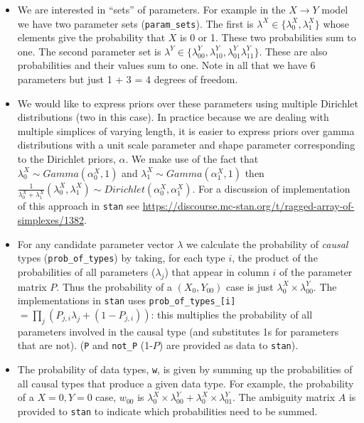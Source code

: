 \documentclass[
  12pt,
]{book}
\begin{document}
\begin{itemize}
\item
  We are interested in ``sets'' of parameters. For example in the \(X \rightarrow Y\) model we have two parameter sets (\texttt{param\_sets}). The first is \(\lambda^X \in \{\lambda^X_0, \lambda^X_1\}\) whose elements give the probability that \(X\) is 0 or 1. These two probabilities sum to one. The second parameter set is \(\lambda^Y \in \{\lambda^Y_{00}, \lambda^Y_{10}, \lambda^Y_{01} \lambda^Y_{11}\}\). These are also probabilities and their values sum to one. Note in all that we have 6 parameters but just 1 + 3 = 4 degrees of freedom.
\item
  We would like to express priors over these parameters using multiple Dirichlet distributions (two in this case). In practice because we are dealing with multiple simplices of varying length, it is easier to express priors over gamma distributions with a unit scale parameter and shape parameter corresponding to the Dirichlet priors, \(\alpha\). We make use of the fact that \(\lambda^X_0 \sim Gamma(\alpha^X_0,1)\) and \(\lambda^X_1 \sim Gamma(\alpha^X_1,1)\) then \(\frac{1}{\lambda^X_0 +\lambda^X_1}(\lambda^X_0, \lambda^X_1) \sim Dirichlet(\alpha^X_0, \alpha^X_1)\). For a discussion of implementation of this approach in \texttt{stan} see \url{https://discourse.mc-stan.org/t/ragged-array-of-simplexes/1382}.
\item
  For any candidate parameter vector \(\lambda\) we calculate the probability of \emph{causal} types (\texttt{prob\_of\_types}) by taking, for each type \(i\), the product of the probabilities of all parameters (\(\lambda_j\)) that appear in column \(i\) of the parameter matrix \(P\). Thus the probability of a \((X_0,Y_{00})\) case is just \(\lambda^X_0 \times \lambda^Y_{00}\). The implementations in \texttt{stan} uses \texttt{prob\_of\_types\_{[}i{]}} \(= \prod_j \left(P_{j,i} \lambda_j + (1-P_{j,i})\right)\): this multiplies the probability of all parameters involved in the causal type (and substitutes 1s for parameters that are not). (\texttt{P} and \texttt{not\_P} (1-\(P\)) are provided as data to \texttt{stan}).
\item
  The probability of data types, \texttt{w}, is given by summing up the probabilities of all causal types that produce a given data type. For example, the probability of a \(X=0,Y=0\) case, \(w_{00}\) is \(\lambda^X_0\times \lambda^Y_{00} + \lambda^X_0\times \lambda^Y_{01}\). The ambiguity matrix \(A\) is provided to \texttt{stan} to indicate which probabilities need to be summed.

\end{itemize}
\end{document}
